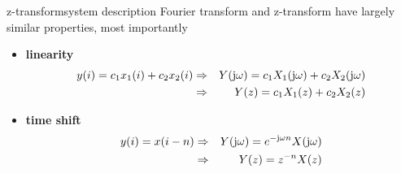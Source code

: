 	\begin{frame}{z-transform}{system description}
        Fourier transform and z-transform have largely similar properties, most importantly
        \begin{itemize}
            \item   \textbf{linearity}
                \begin{eqnarray*}
                    y(i) = c_1 x_1(i) + c_2 x_2(i) &\Rightarrow& Y(\mathrm{j}\omega) = c_1 X_1(\mathrm{j}\omega) + c_2 X_2(\mathrm{j}\omega)\\
                     &\Rightarrow& Y(z) = c_1 X_1(z) + c_2 X_2(z)
                \end{eqnarray*}
            \smallskip
            \item   \textbf{time shift}
                \begin{eqnarray*}
                    y(i) = x(i-n) &\Rightarrow& Y(\mathrm{j}\omega) = e^{-\mathrm{j}\omega n} X(\mathrm{j}\omega) \\
                     &\Rightarrow& Y(z) =  z^{-n} X(z)
                \end{eqnarray*}
        \end{itemize}
        
	\end{frame}

